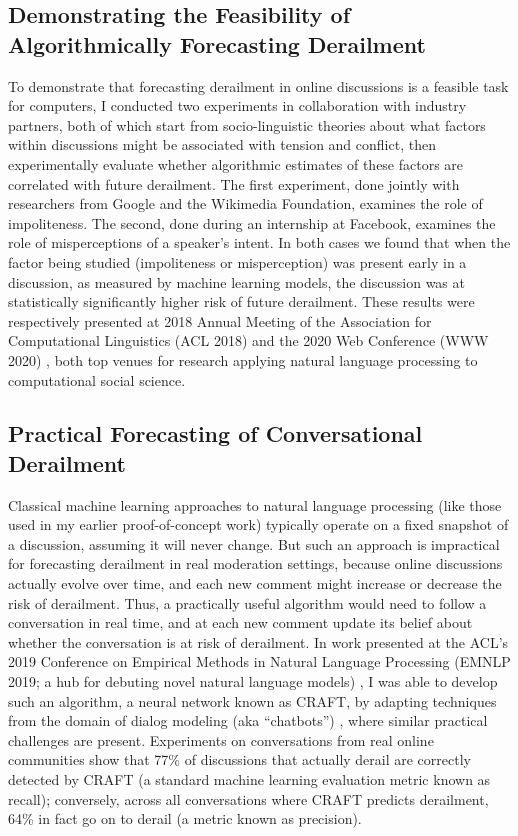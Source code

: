 \documentclass[11pt,letterpaper]{article}
\begin{document}
\subsection{Demonstrating the Feasibility of Algorithmically Forecasting Derailment}
To demonstrate that forecasting derailment in online discussions is a feasible task for computers, I conducted two experiments in collaboration with industry partners, both of which start from socio-linguistic theories about what factors within discussions might be associated with tension and conflict, then experimentally evaluate whether algorithmic estimates of these factors are correlated with future derailment.
The first experiment, done jointly with researchers from Google and the Wikimedia Foundation, examines the role of impoliteness.
The second, done during an internship at Facebook, examines the role of misperceptions of a speaker's intent.
In both cases we found that when the factor being studied (impoliteness or misperception) was present early in a discussion, as measured by machine learning models, the discussion was at statistically significantly higher risk of future derailment.
These results were respectively presented at 2018 Annual Meeting of the Association for Computational Linguistics (ACL 2018) \cite{zhang_conversations_2018} and the 2020 Web Conference (WWW 2020) \cite{chang_dont_2020}, both top venues for research applying natural language processing to computational social science.

\subsection{Practical Forecasting of Conversational Derailment}
Classical machine learning approaches to natural language processing (like those used in my earlier proof-of-concept work) typically operate on a fixed snapshot of a discussion, assuming it will never change.
But such an approach is impractical for forecasting derailment in real moderation settings, because online discussions actually evolve over time, and each new comment might increase or decrease the risk of derailment.
Thus, a practically useful algorithm would need to follow a conversation in real time, and at each new comment update its belief about whether the conversation is at risk of derailment.
In work presented at the ACL's 2019 Conference on Empirical Methods in Natural Language Processing (EMNLP 2019; a hub for debuting novel natural language models) \cite{chang_trouble_2019}, I was able to develop such an algorithm, a neural network known as CRAFT, by adapting techniques from the domain of dialog modeling (aka ``chatbots'') \cite{serban_building_2016}, where similar practical challenges are present.
Experiments on conversations from real online communities show that 77\% of discussions that actually derail are correctly detected by CRAFT (a standard machine learning evaluation metric known as recall); conversely, across all conversations where CRAFT predicts derailment, 64\% in fact go on to derail (a metric known as precision).
\end{document}
